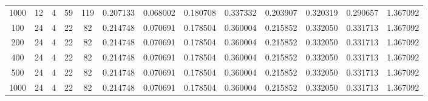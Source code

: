\begin{table}[h]
\begin{tabular}{ccccccccccccc}
1000 & 12 & 4 & 59 & 119 & 0.207133 & 0.068002 & 0.180708 & 0.337332 & 0.203907 & 0.320319 & 0.290657 & 1.367092 \\
100 & 24 & 4 & 22 & 82 & 0.214748 & 0.070691 & 0.178504 & 0.360004 & 0.215852 & 0.332050 & 0.331713 & 1.367092 \\
200 & 24 & 4 & 22 & 82 & 0.214748 & 0.070691 & 0.178504 & 0.360004 & 0.215852 & 0.332050 & 0.331713 & 1.367092 \\
400 & 24 & 4 & 22 & 82 & 0.214748 & 0.070691 & 0.178504 & 0.360004 & 0.215852 & 0.332050 & 0.331713 & 1.367092 \\
500 & 24 & 4 & 22 & 82 & 0.214748 & 0.070691 & 0.178504 & 0.360004 & 0.215852 & 0.332050 & 0.331713 & 1.367092 \\
1000 & 24 & 4 & 22 & 82 & 0.214748 & 0.070691 & 0.178504 & 0.360004 & 0.215852 & 0.332050 & 0.331713 & 1.367092 \\
\bottomrule
\end{tabular}
\end{table}
